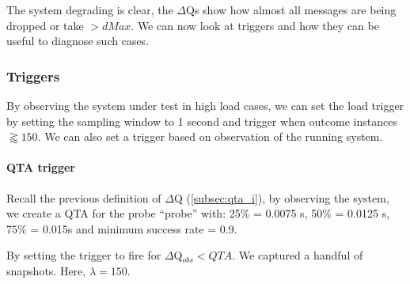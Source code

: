     The system degrading is clear, the $\Delta$Qs show how almost all messages are being dropped or take $> dMax$. We can now look at triggers and how they can be useful to diagnose such cases.
  
    \subsubsection{Triggers}
        By observing the system under test in high load cases, we can set the load trigger by setting the sampling window to 1 second and trigger when outcome instances $\gtrapprox 150$. We can also set a trigger based on observation of the running system.

        \paragraph{QTA trigger}
            Recall the previous definition of $\Delta$Q (\cref{subsec:qta_i}), by observing the system, we create a QTA for the probe ``probe'' with: 25\% = 0.0075 s, 50\% = 0.0125 s, 75\% = 0.015s and minimum success rate = 0.9.

            By setting the trigger to fire for $\Delta$Q$_{obs} < QTA$. We captured a handful of snapshots. Here, $\lambda = 150$.
        
